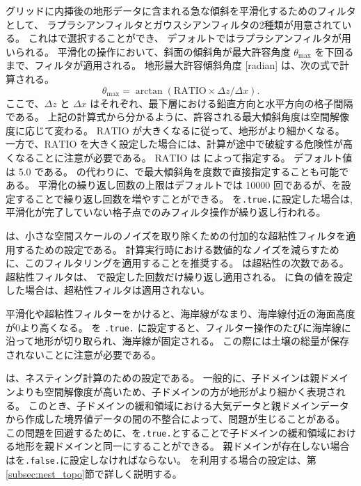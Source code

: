 \scale グリッドに内挿後の地形データに含まれる急な傾斜を平滑化するためのフィルタとして、
ラプラシアンフィルタとガウスシアンフィルタの2種類が用意されている。
これはで選択することができ、
デフォルトではラプラシアンフィルタが用いられる。
平滑化の操作において、斜面の傾斜角が最大許容角度 $\theta_{\max}$ を下回るまで、フィルタが適用される。
地形最大許容傾斜角度 [radian] は、次の式で計算される。
\begin{equation*}
  \theta_{\max} = \arctan( \mathrm{RATIO} \times \Delta z / \Delta x ).
\end{equation*}
ここで、$\Delta z$ と $\Delta x$ はそれぞれ、最下層における鉛直方向と水平方向の格子間隔である。
上記の計算式から分かるように、許容される最大傾斜角度は空間解像度に応じて変わる。
$\mathrm{RATIO}$ が大きくなるに従って、地形がより細かくなる。
一方で、$\mathrm{RATIO}$ を大きく設定した場合には、計算が途中で破綻する危険性が高くなることに注意が必要である。
$\mathrm{RATIO}$ は  によって指定する。
デフォルト値は 5.0 である。
 の代わりに、で最大傾斜角を度数で直接指定することも可能である。
平滑化の繰り返し回数の上限はデフォルトでは 10000 回であるが、を設定することで繰り返し回数を増やすことができる。
を\verb|.true.|に設定した場合は, 平滑化が完了していない格子点でのみフィルタ操作が繰り返し行われる。

は、小さな空間スケールのノイズを取り除くための付加的な超粘性フィルタを適用するための設定である。
計算実行時における数値的なノイズを減らすために、このフィルタリングを適用することを推奨する。
 は超粘性の次数である。
超粘性フィルタは、 で設定した回数だけ繰り返し適用される。
に負の値を設定した場合は、超粘性フィルタは適用されない。

平滑化や超粘性フィルターをかけると、海岸線がなまり、海岸線付近の海面高度が0より高くなる。
 を \verb|.true.| に設定すると、フィルター操作のたびに海岸線に沿って地形が切り取られ、海岸線が固定される。
この際には土壌の総量が保存されないことに注意が必要である。

は、ネスティング計算のための設定である。
一般的に、子ドメインは親ドメインよりも空間解像度が高いため、子ドメインの方が地形がより細かく表現される。
このとき、子ドメインの緩和領域における大気データと親ドメインデータから作成した境界値データの間の不整合によって、問題が生じることがある。
この問題を回避するために、を\verb|.true.|とすることで子ドメインの緩和領域における地形を親ドメインと同一にすることができる。
親ドメインが存在しない場合はを\verb|.false.|に設定しなければならない。
を利用する場合の設定は、第\ref{subsec:nest_topo}節で詳しく説明する。


